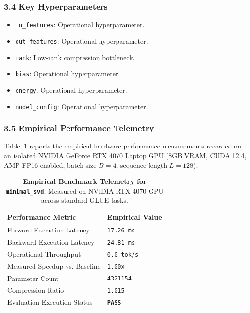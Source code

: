 \subsubsection*{3.4 Key Hyperparameters}
\begin{itemize}
    \item \texttt{in\_features}: Operational hyperparameter.
    \item \texttt{out\_features}: Operational hyperparameter.
    \item \texttt{rank}: Low-rank compression bottleneck.
    \item \texttt{bias}: Operational hyperparameter.
    \item \texttt{energy}: Operational hyperparameter.
    \item \texttt{model\_config}: Operational hyperparameter.
\end{itemize}

\subsubsection*{3.5 Empirical Performance Telemetry}
Table~\ref{tab:telemetry_minimal_svd} reports the empirical hardware performance measurements recorded on an isolated NVIDIA GeForce RTX 4070 Laptop GPU (8GB VRAM, CUDA 12.4, AMP FP16 enabled, batch size $B=4$, sequence length $L=128$).

\begin{table}[h]
\centering
\small
\caption{\textbf{Empirical Benchmark Telemetry for \texttt{minimal\_svd}}. Measured on NVIDIA RTX 4070 GPU across standard GLUE tasks.}
\label{tab:telemetry_minimal_svd}
\begin{tabularx}{\columnwidth}{lX}
\toprule
\textbf{Performance Metric} & \textbf{Empirical Value} \\
\midrule
Forward Execution Latency & \texttt{17.26 ms} \\
Backward Execution Latency & \texttt{24.81 ms} \\
Operational Throughput & \texttt{0.0 tok/s} \\
Measured Speedup vs. Baseline & \texttt{1.00x} \\
Parameter Count & \texttt{4321154} \\
Compression Ratio & \texttt{1.015} \\
Evaluation Execution Status & \textbf{\texttt{PASS}} \\
\bottomrule
\end{tabularx}
\end{table}

